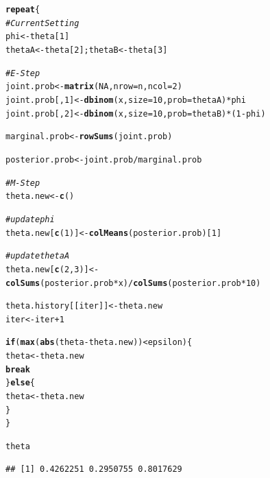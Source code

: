\documentclass[11pt, a4paper]{article}\usepackage[]{graphicx}\usepackage[]{xcolor}
\makeatletter
\newcommand{\hlnum}[1]{\textcolor[rgb]{0.686,0.059,0.569}{#1}}%
\newcommand{\hlcom}[1]{\textcolor[rgb]{0.678,0.584,0.686}{\textit{#1}}}%
\newcommand{\hlopt}[1]{\textcolor[rgb]{0,0,0}{#1}}%
\newcommand{\hldef}[1]{\textcolor[rgb]{0.345,0.345,0.345}{#1}}%
\newcommand{\hlkwa}[1]{\textcolor[rgb]{0.161,0.373,0.58}{\textbf{#1}}}%
\newcommand{\hlkwb}[1]{\textcolor[rgb]{0.69,0.353,0.396}{#1}}%
\newcommand{\hlkwc}[1]{\textcolor[rgb]{0.333,0.667,0.333}{#1}}%
\newcommand{\hlkwd}[1]{\textcolor[rgb]{0.737,0.353,0.396}{\textbf{#1}}}%
\newenvironment{kframe}{%
 \def\at@end@of@kframe{}%
 \ifinner\ifhmode%
  \def\at@end@of@kframe{\end{minipage}}%
  \begin{minipage}{\columnwidth}%
 \fi\fi%
 \def\FrameCommand##1{\hskip\@totalleftmargin \hskip-\fboxsep
 \colorbox{shadecolor}{##1}\hskip-\fboxsep
     \hskip-\linewidth \hskip-\@totalleftmargin \hskip\columnwidth}%
 \MakeFramed {\advance\hsize-\width
   \@totalleftmargin\z@ \linewidth\hsize
   \@setminipage}}%
 {\par\unskip\endMakeFramed%
 \at@end@of@kframe}
\newenvironment{knitrout}{}{} %
\makeatother
\begin{document}
\begin{enumerate}
\begin{knitrout}
\color{fgcolor}\begin{kframe}
\begin{alltt}
\hlkwa{repeat}\hldef{\{}
  \hlcom{# Current Setting}
  \hldef{phi} \hlkwb{<-} \hldef{theta[}\hlnum{1}\hldef{]}
  \hldef{thetaA} \hlkwb{<-} \hldef{theta[}\hlnum{2}\hldef{]; thetaB} \hlkwb{<-} \hldef{theta[}\hlnum{3}\hldef{]}

  \hlcom{# E-Step}
  \hldef{joint.prob} \hlkwb{<-} \hlkwd{matrix}\hldef{(}\hlnum{NA}\hldef{,} \hlkwc{nrow} \hldef{= n,} \hlkwc{ncol} \hldef{=} \hlnum{2}\hldef{)}
  \hldef{joint.prob[,}\hlnum{1}\hldef{]} \hlkwb{<-} \hlkwd{dbinom}\hldef{(x,} \hlkwc{size} \hldef{=} \hlnum{10}\hldef{,} \hlkwc{prob} \hldef{= thetaA)} \hlopt{*} \hldef{phi}
  \hldef{joint.prob[,}\hlnum{2}\hldef{]} \hlkwb{<-} \hlkwd{dbinom}\hldef{(x,} \hlkwc{size} \hldef{=} \hlnum{10}\hldef{,} \hlkwc{prob} \hldef{= thetaB)} \hlopt{*} \hldef{(}\hlnum{1} \hlopt{-} \hldef{phi)}

  \hldef{marginal.prob} \hlkwb{<-} \hlkwd{rowSums}\hldef{(joint.prob)}

  \hldef{posterior.prob} \hlkwb{<-} \hldef{joint.prob} \hlopt{/} \hldef{marginal.prob}


  \hlcom{# M-Step}
  \hldef{theta.new} \hlkwb{<-} \hlkwd{c}\hldef{()}

  \hlcom{# update phi}
  \hldef{theta.new[}\hlkwd{c}\hldef{(}\hlnum{1}\hldef{)]} \hlkwb{<-} \hlkwd{colMeans}\hldef{(posterior.prob)[}\hlnum{1}\hldef{]}

  \hlcom{# update thetaA}
  \hldef{theta.new[}\hlkwd{c}\hldef{(}\hlnum{2}\hldef{,} \hlnum{3}\hldef{)]} \hlkwb{<-} \hlkwd{colSums}\hldef{(posterior.prob} \hlopt{*} \hldef{x)} \hlopt{/} \hlkwd{colSums}\hldef{(posterior.prob} \hlopt{*} \hlnum{10}\hldef{)}

  \hldef{theta.history[[iter]]} \hlkwb{<-} \hldef{theta.new}
  \hldef{iter} \hlkwb{<-} \hldef{iter} \hlopt{+} \hlnum{1}

  \hlkwa{if}\hldef{(}\hlkwd{max}\hldef{(}\hlkwd{abs}\hldef{(theta} \hlopt{-} \hldef{theta.new))} \hlopt{<} \hldef{epsilon)\{}
    \hldef{theta} \hlkwb{<-} \hldef{theta.new}
    \hlkwa{break}
  \hldef{\}}\hlkwa{else}\hldef{\{}
    \hldef{theta} \hlkwb{<-} \hldef{theta.new}
  \hldef{\}}
\hldef{\}}
\end{alltt}
\end{kframe}
\end{knitrout}

\begin{knitrout}
\color{fgcolor}\begin{kframe}
\begin{alltt}
\hldef{theta}
\end{alltt}
\begin{verbatim}
## [1] 0.4262251 0.2950755 0.8017629
\end{verbatim}
\end{kframe}
\end{knitrout}


\end{enumerate}
\end{document}
